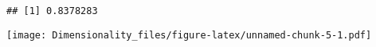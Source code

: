 \documentclass[
]{article}
\newenvironment{Shaded}{\begin{snugshade}}{\end{snugshade}}
\newcommand{\DecValTok}[1]{\textcolor[rgb]{0.00,0.00,0.81}{#1}}
\newcommand{\FunctionTok}[1]{\textcolor[rgb]{0.00,0.00,0.00}{#1}}
\newcommand{\NormalTok}[1]{#1}
\newcommand{\SpecialCharTok}[1]{\textcolor[rgb]{0.00,0.00,0.00}{#1}}
\begin{document}
\begin{verbatim}
## [1] 0.8378283
\end{verbatim}

\begin{Shaded}
\end{Shaded}

\texttt{[image: Dimensionality\_files/figure-latex/unnamed-chunk-5-1.pdf]}
\end{document}

